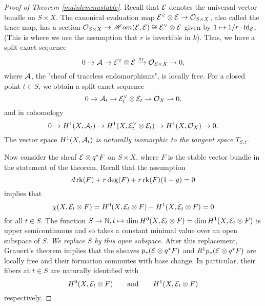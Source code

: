 \documentclass[letterpaper,12pt]{amsart}
\theoremstyle{remark}
\begin{document}
\begin{proof}[Proof of Theorem \ref{mainlemmastable}]
Recall that $\mathcal{E}$ denotes the universal vector bundle on $S \times X$. The canonical evaluation map $\mathcal{E}^\vee \otimes \mathcal{E} \to \mathcal{O}_{S \times X}$, also called the trace map, has a section $\mathcal{O}_{S \times X} \to \mathscr{H}om(\mathcal{E}, \mathcal{E}) \cong \mathcal{E}^\vee \otimes \mathcal{E}$ given by $1 \mapsto 1/r \cdot \mathrm{id}_{\mathcal{E}}$. (This is where we use the assumption that $r$ is invertible in $k$). Thus, we have a split exact sequence
\[ 0 \to \mathcal{A} \to \mathcal{E}^\vee \otimes \mathcal{E} \xrightarrow{\mathrm{tr}} \mathcal{O}_{S \times X} \to 0, \]
where $\mathcal{A}$, the "sheaf of traceless endomorphisms", is locally free. For a closed point $t \in S$, we obtain a split exact sequence
\[ 0 \to \mathcal{A}_t \to \mathcal{E}_t^\vee \otimes \mathcal{E}_t \to \mathcal{O}_X \to 0, \]
and in cohomology
\begin{equation} \label{H1exact}
    0 \to H^1(X, \mathcal{A}_t) \to H^1(X, \mathcal{E}_t^\vee \otimes \mathcal{E}_t) \to H^1(X, \mathcal{O}_X) \to 0.
\end{equation}
The vector space $H^1(X, \mathcal{A}_t)$ \emph{is naturally isomorphic to the tangent space} $T_{S,t}$.

Now consider the sheaf $\mathcal{E} \otimes q^*F$ on $S \times X$, where $F$ is the stable vector bundle in the statement of the theorem. Recall that the assumption
\[ d \operatorname{\mathrm{rk}}(F) + r \deg(F) + r \operatorname{\mathrm{rk}}(F) (1-g) = 0 \]
implies that 
\[ \chi(X, \mathcal{E}_t \otimes F) = H^0(X, \mathcal{E}_t \otimes F) - H^1(X, \mathcal{E}_t \otimes F) = 0 \] 
for all $t \in S$. The function $S \to \mathbb{N}, t \mapsto \dim H^0(X, \mathcal{E}_t \otimes F) = \dim H^1(X, \mathcal{E}_t \otimes F)$ is upper semicontinuous and so takes a constant minimal value over an open subspace of $S$. \emph{We replace $S$ by this open subspace.} After this replacement, Grauert's theorem implies that the sheaves $p_*(\mathcal{E} \otimes q^*F)$ and $R^1 p_*(\mathcal{E} \otimes q^*F)$ are locally free and their formation commutes with base change. In particular, their fibers at $t \in S$ are naturally identified with 
\[ H^0(X, \mathcal{E}_t \otimes F) \qquad \mathrm{and} \qquad H^1(X, \mathcal{E}_t \otimes F) \] respectively.


\end{proof}
\end{document}
